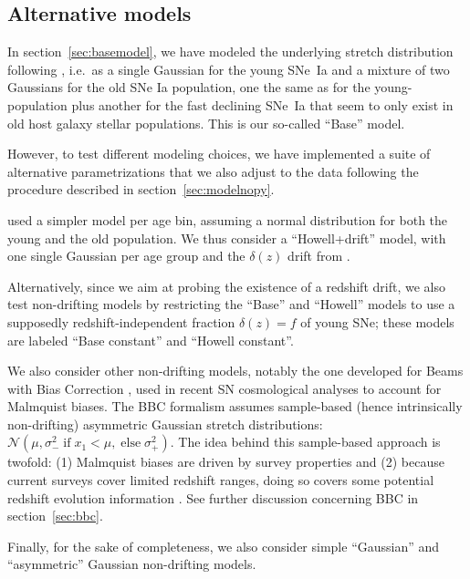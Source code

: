 \documentclass[]{aa} %
\begin{document}
\subsection{Alternative models}\label{sec:othermodel}

In section~\ref{sec:basemodel}, we have modeled the underlying stretch
distribution following \cite{rigault2018}, i.e.\ as a single Gaussian for the
young SNe~Ia and a mixture of two Gaussians for the old SNe Ia population, one
the same as for the young-population plus another for the fast declining SNe~Ia
that seem to only exist in old host galaxy stellar populations. This is our
so-called ``Base'' model.

However, to test different modeling choices, we have implemented a suite of
alternative parametrizations that we also adjust to the data following the
procedure described in section~\ref{sec:modelnopy}. 

\cite{howell2007} used a simpler model per age bin, assuming a normal
distribution for both the young and the old population. We thus consider a
``Howell+drift'' model, with one single Gaussian per age group and the
$\delta(z)$  drift from \cite[][see Eq.~\ref{eq:delta}]{rigault2018}.

Alternatively, since we aim at probing the existence of a redshift drift, we
also test non-drifting models by restricting the ``Base'' and ``Howell'' models
to use a supposedly redshift-independent fraction $\delta(z) = f$ of young SNe;
these models are labeled ``Base constant'' and ``Howell constant''.

We also consider other non-drifting models, notably the one developed for Beams
with Bias Correction \cite[BBC,][]{scolnic2016, kessler2017}, used in recent SN
cosmological analyses \cite[e.g.][]{scolnic2018a, descosmopaper2019, riess2016,
riess2019} to account for Malmquist biases. The BBC formalism assumes
sample-based (hence intrinsically non-drifting) asymmetric Gaussian stretch
distributions: $\mathcal{N}\left(\mu,
\sigma_{-}^2\;\text{if}\;x_1<\mu,\;\text{else}\;\sigma_{+}^2\right)$. The idea
behind this sample-based approach is twofold: (1) Malmquist biases are driven by
survey properties and (2) because current surveys cover limited redshift ranges,
doing so covers some potential redshift evolution information
\citep{scolnic2016, scolnic2018a}. See further discussion concerning BBC in
section~\ref{sec:bbc}. 

Finally, for the sake of completeness, we also consider simple ``Gaussian'' and
``asymmetric'' Gaussian non-drifting models. 
\end{document}
